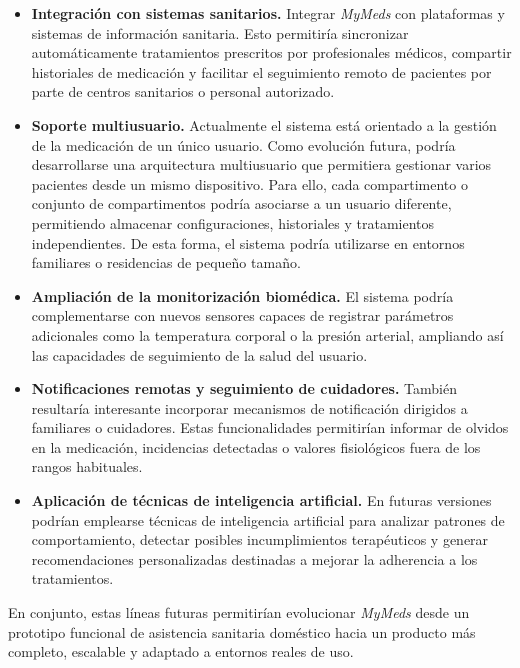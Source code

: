 \begin{itemize}

\item \textbf{Integración con sistemas sanitarios.} Integrar \textit{MyMeds} con plataformas y sistemas de información sanitaria. Esto permitiría sincronizar automáticamente tratamientos prescritos por profesionales médicos, compartir historiales de medicación y facilitar el seguimiento remoto de pacientes por parte de centros sanitarios o personal autorizado.

\item \textbf{Soporte multiusuario.} Actualmente el sistema está orientado a la gestión de la medicación de un único usuario. Como evolución futura, podría desarrollarse una arquitectura multiusuario que permitiera gestionar varios pacientes desde un mismo dispositivo. Para ello, cada compartimento o conjunto de compartimentos podría asociarse a un usuario diferente, permitiendo almacenar configuraciones, historiales y tratamientos independientes. De esta forma, el sistema podría utilizarse en entornos familiares o residencias de pequeño tamaño.

\item \textbf{Ampliación de la monitorización biomédica.} El sistema podría complementarse con nuevos sensores capaces de registrar parámetros adicionales como la temperatura corporal o la presión arterial, ampliando así las capacidades de seguimiento de la salud del usuario.

\item \textbf{Notificaciones remotas y seguimiento de cuidadores.} También resultaría interesante incorporar mecanismos de notificación dirigidos a familiares o cuidadores. Estas funcionalidades permitirían informar de olvidos en la medicación, incidencias detectadas o valores fisiológicos fuera de los rangos habituales.

\item \textbf{Aplicación de técnicas de inteligencia artificial.} En futuras versiones podrían emplearse técnicas de inteligencia artificial para analizar patrones de comportamiento, detectar posibles incumplimientos terapéuticos y generar recomendaciones personalizadas destinadas a mejorar la adherencia a los tratamientos.

\end{itemize}

En conjunto, estas líneas futuras permitirían evolucionar \textit{MyMeds} desde un prototipo funcional de asistencia sanitaria doméstico hacia un producto más completo, escalable y adaptado a entornos reales de uso.


